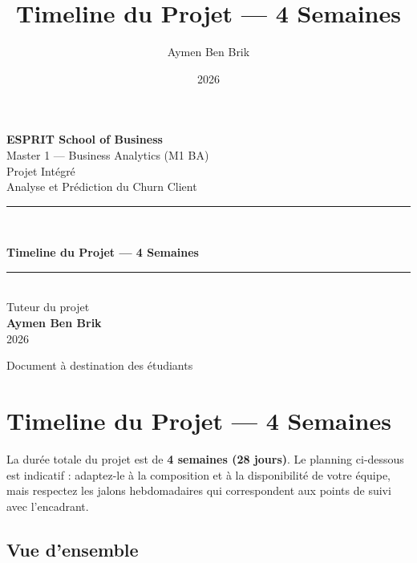 \documentclass[11pt,a4paper]{article}
\title{\color{primary}\textbf{Timeline du Projet --- 4 Semaines}}
\author{Aymen Ben Brik}
\date{2026}
\begin{document}
\begin{titlepage}
\centering
\vspace*{1.5cm}

{\Large\bfseries ESPRIT School of Business}\\[0.3cm]
{\large Master 1 --- Business Analytics (M1 BA)}\\[2cm]

{\color{gray}\large Projet Intégré}\\[0.3cm]
{\color{gray}\large Analyse et Prédiction du Churn Client}\\[2.2cm]

\rule{0.85\linewidth}{1.2pt}\\[0.6cm]
{\Huge\bfseries\color{primary} Timeline du Projet --- 4 Semaines\par}
\rule{0.85\linewidth}{1.2pt}\\[2cm]

{\large Tuteur du projet}\\[0.2cm]
{\Large\bfseries Aymen Ben Brik}\\[1cm]
{\large 2026}

\vfill
{\color{gray}\small Document à destination des étudiants}
\end{titlepage}

\tableofcontents
\newpage

\section{Timeline du Projet --- 4
Semaines}\label{timeline-du-projet-4-semaines}

La durée totale du projet est de \textbf{4 semaines (28 jours)}. Le
planning ci-dessous est indicatif : adaptez-le à la composition et à la
disponibilité de votre équipe, mais respectez les jalons hebdomadaires
qui correspondent aux points de suivi avec l'encadrant.

\subsection{Vue d'ensemble}\label{vue-densemble}
\end{document}
